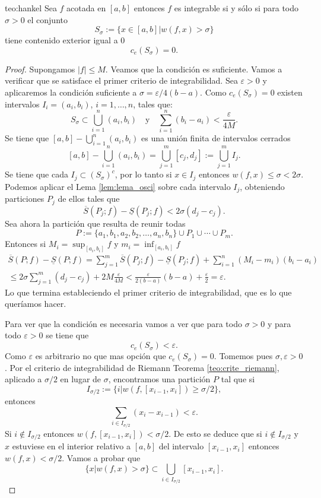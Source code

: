  
 \begin{teorema}{teo:hankel}  Sea $f$ acotada en $[a,b]$ entonces $f$ es integrable si y sólo si para todo $\sigma>0$ el conjunto 
 $$S_{\sigma}:=\{x\in [a,b]| w(f,x)>\sigma\}$$ 
 tiene contenido exterior igual a $0$ 
 $$c_e(S_{\sigma})=0.$$
   \end{teorema}
\begin{proof}  Supongamos $|f|\leq M$. Veamos que la condición es suficiente. Vamos a verificar que se satisface el primer criterio de integrabilidad. Sea $\varepsilon>0$ y aplicaremos la condición suficiente a $\sigma=\varepsilon/4(b-a)$. Como $c_e(S_\sigma)=0$ existen intervalos $I_i=(a_i,b_i)$, $i=1,\ldots,n$, tales que:
$$S_\sigma\subset \bigcup_{i=1}^n(a_i,b_i)\quad\text{y}\quad \sum_{i=1}^n(b_i-a_i)<\frac{\varepsilon}{4M}.$$ 
 Se tiene que $[a,b]-\bigcup_{i=1}^n(a_i,b_i)$ es una unión finita de intervalos cerrados
 \[
  [a,b]-\bigcup_{i=1}^n(a_i,b_i)= \bigcup_{j=1}^m [c_j,d_j]:= \bigcup_{j=1}^m I_j.
 \]
Se tiene que cada $I_j\subset \left(S_\sigma\right)^c$, por lo tanto si $x\in I_j$ entonces $w(f,x)\leq \sigma<2\sigma$. Podemos aplicar el Lema \ref{lem:lema_osci} sobre cada intervalo $I_j$, obteniendo particiones $P_j$ de ellos tales que
 \[ \overline{S}(P_j;f)-\underline{S}(P_j;f)<2\sigma(d_j-c_j).\]
 Sea ahora la partición que resulta de reunir todas 
 \[
  P:=\{a_1,b_1,a_2,b_2,\ldots,a_n,b_n\}\cup P_1\cup\cdots\cup P_m.
 \]
Entonces si $M_i=\sup_{[a_i,b_i]}f$ y $m_i=\inf_{[a_i,b_i]}f$
\begin{multline*}
  \overline{S}(P;f)-\underline{S}(P;f)=\sum_{j=1}^m \overline{S}(P_j;f)-\underline{S}(P_j;f)+\sum_{i=1}^n(M_i-m_i)(b_i-a_i)\\
  \leq 2\sigma\sum_{j=1}^m(d_j-c_j)+2M\frac{\varepsilon}{4M}<\frac{\varepsilon}{2(b-a)}(b-a)+\frac{\varepsilon}{2}=\varepsilon.
\end{multline*}
Lo que termina estableciendo el primer criterio de integrabilidad, que es lo que queríamos hacer.

Para ver que la condición es necesaria vamos a ver que para todo $\sigma>0$ y para todo $\varepsilon>0$ se tiene que 
\begin{equation}\label{eq:hankel_final}
 c_e(S_\sigma)<\varepsilon.
\end{equation}
Como $\varepsilon$ es arbitrario no que mas opción que $c_e(S_\sigma)=0$. Tomemos pues $\sigma,\varepsilon>0$. Por el criterio de integrabilidad de Riemann Teorema \ref{teo:crite_riemann}, aplicado a $\sigma/2$ en lugar de $\sigma$, encontramos una partición $P$ tal que si 
\[
 I_{\sigma/2}:=\{i|w(f,[x_{i-1},x_i])\geq\sigma/2\},
\] 
entonces
\[
 \sum_{i\in I_{\sigma/2}}(x_i-x_{i-1})<\varepsilon.
\]
Si $i\notin I_{\sigma/2}$ entonces $w(f,[x_{i-1},x_i])<\sigma/2$. De esto se deduce que  si $i\notin I_{\sigma/2}$ y $x$ estuviese en el interior relativo a $[a,b]$ del intervalo $[x_{i-1},x_i]$ entonces $w(f,x)<\sigma/2$. Vamos a probar que
\begin{equation}\label{eq:hankel_conj=}
 \{x| w(f,x)>\sigma\}\subset \bigcup_{i\in I_{\sigma/2}}[x_{i-1},x_i].
\end{equation}


\end{proof}
